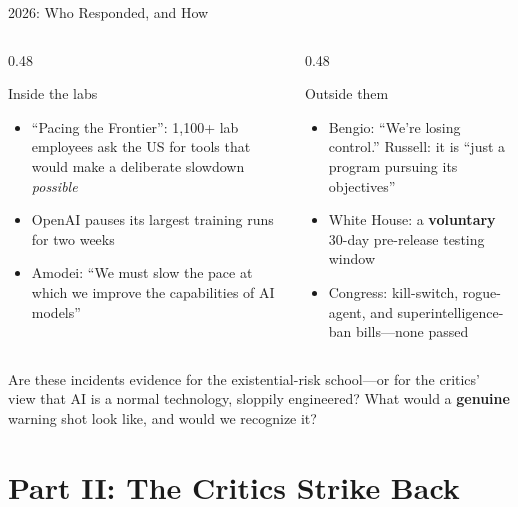 \documentclass[aspectratio=169,11pt]{beamer}
\begin{document}
\begin{frame}[shrink=8]{2026: Who Responded, and How}
\begin{columns}[T]
\begin{column}{0.48\textwidth}
\begin{block}{Inside the labs}
\scriptsize
\begin{itemize}
    \item ``Pacing the Frontier'': 1,100+ lab employees ask the US for tools that would make a deliberate slowdown \emph{possible}
    \item OpenAI pauses its largest training runs for two weeks
    \item Amodei: ``We must slow the pace at which we improve the capabilities of AI models'' \parencite{amodei_pace_2026}
\end{itemize}
\end{block}
\end{column}
\begin{column}{0.48\textwidth}
\begin{block}{Outside them}
\scriptsize
\begin{itemize}
    \item Bengio: ``We're losing control.'' Russell: it is ``just a program pursuing its objectives''
    \item White House: a \textbf{voluntary} 30-day pre-release testing window \parencite{whitehouse_eo14409_2026}
    \item Congress: kill-switch, rogue-agent, and superintelligence-ban bills---none passed
\end{itemize}
\end{block}
\end{column}
\end{columns}

\begin{discussionbox}[Discussion]
\small Are these incidents evidence for the existential-risk school---or for the critics' view that AI is a normal technology, sloppily engineered? What would a \textbf{genuine} warning shot look like, and would we recognize it?
\end{discussionbox}
\end{frame}

\section{Part II: The Critics Strike Back}
\end{document}
